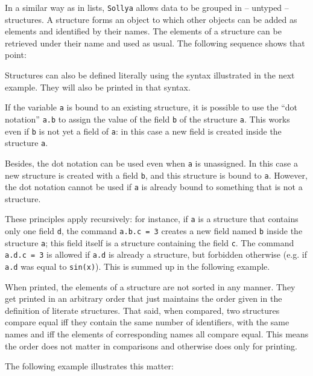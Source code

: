 \documentclass[a4paper]{article}
\newcommand{\sollya}{\texttt{Sollya}\xspace}
\begin{document}
In a similar way as in lists, \sollya allows data to be grouped in --
untyped -- structures. A structure forms an object to which other
objects can be added as elements and identified by their names. The
elements of a structure can be retrieved under their name and used as
usual. The following sequence shows that point:



Structures can also be defined literally using the syntax illustrated
in the next example. They will also be printed in that syntax.



If the variable \texttt{a} is bound to an existing structure, it is possible to use the ``dot notation'' \texttt{a.b} to assign the value of the field \texttt{b} of the structure \texttt{a}. This works even if \texttt{b} is not yet a field of \texttt{a}: in this case a new field is created inside the structure \texttt{a}. 

Besides, the dot notation can be used even when \texttt{a} is unassigned. In this case a new structure is created with a field \texttt{b}, and this structure is bound to \texttt{a}. However, the dot notation cannot be used if \texttt{a} is already bound to something that is not a structure.

These principles apply recursively: for instance, if \texttt{a} is a structure that contains only one field \texttt{d}, the command \texttt{a.b.c = 3} creates a new field named \texttt{b} inside the structure \texttt{a}; this field itself is a structure containing the field \texttt{c}. The command \texttt{a.d.c = 3} is allowed if \texttt{a.d} is already a structure, but forbidden otherwise (e.g. if \texttt{a.d} was equal to \texttt{sin(x)}). This is summed up in the following example.



When printed, the elements of a structure are not sorted in any
manner. They get printed in an arbitrary order that just maintains the
order given in the definition of literate structures. That said, when
compared, two structures compare equal iff they contain the same
number of identifiers, with the same names and iff the elements of
corresponding names all compare equal. This means the order does
not matter in comparisons and otherwise does only for printing.

The following example illustrates this matter:


\end{document}
